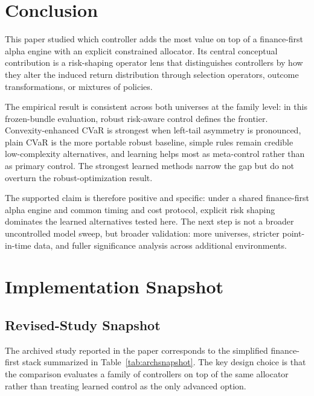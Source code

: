 \documentclass[10pt,twocolumn]{article}
\begin{document}
\section{Conclusion}

This paper studied which controller adds the most value on top of a
finance-first alpha engine with an explicit constrained allocator. Its central
conceptual contribution is a risk-shaping operator lens that distinguishes
controllers by how they alter the induced return distribution through selection
operators, outcome transformations, or mixtures of policies.

The empirical result is consistent across both universes at the family level:
in this frozen-bundle evaluation, robust risk-aware control defines the
frontier. Convexity-enhanced CVaR is strongest when left-tail asymmetry is
pronounced, plain CVaR is the more portable robust baseline, simple rules
remain credible low-complexity alternatives, and learning helps most as
meta-control rather than as primary control. The strongest learned methods
narrow the gap but do not overturn the
robust-optimization result.

The supported claim is therefore positive and specific: under a shared
finance-first alpha engine and common timing and cost protocol, explicit risk
shaping dominates the learned alternatives tested here. The next step is not a
broader uncontrolled model sweep, but broader validation: more universes,
stricter point-in-time data, and fuller significance analysis across additional
environments.

\appendix

\section{Implementation Snapshot}

\subsection{Revised-Study Snapshot}

The archived study reported in the paper corresponds to the simplified
finance-first stack summarized in Table~\ref{tab:archsnapshot}. The key design
choice is that the comparison evaluates a family of controllers on top of the
same allocator rather than treating learned control as the only advanced
option.
\end{document}
